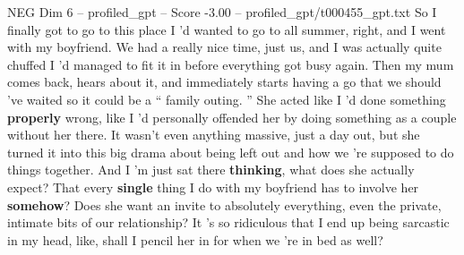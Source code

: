 \begin{textsample}{NEG Dim 6 – profiled\_gpt – Score -3.00 – profiled\_gpt/t000455\_gpt.txt}  \label{ex:f6_neg_004}
So I finally got to go to this place I ’d wanted to go to all summer, right, and I went with my boyfriend.
We had a really nice time, just us, and I was actually quite chuffed I ’d managed to fit it in before everything got busy again.
Then my mum comes back, hears about it, and immediately starts having a go that we should ’ve waited so it could be a “ family outing. ” She acted like I ’d done something \textbf{properly} wrong, like I ’d personally offended her by doing something as a couple without her there.
It wasn't even anything massive, just a day out, but she turned it into this big drama about being left out and how we ’re supposed to do things together.
And I ’m just sat there \textbf{thinking}, what does she actually expect?
That every \textbf{single} thing I do with my boyfriend has to involve her \textbf{somehow}?
Does she want an invite to absolutely everything, even the private, intimate bits of our relationship?
It ’s so ridiculous that I end up being sarcastic in my head, like, shall I pencil her in for when we ’re in bed as well?

\end{textsample}
